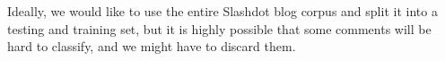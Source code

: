 \documentclass[a4paper,12pt]{article}
\numberwithin{equation}{section}
\begin{document}
Ideally, we would like to use the entire Slashdot blog corpus and split it into a testing and training set, but it is highly possible that some comments will be hard to classify, and we might have to discard them.











\end{document}
